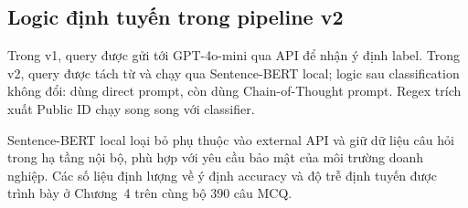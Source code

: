 \documentclass[../DoAn.tex]{subfiles}
\begin{document}
\subsection{Logic định tuyến trong pipeline v2}
\label{subsection:3.9.3}

Trong v1, query được gửi tới GPT-4o-mini qua API để nhận ý định label. Trong v2, query được tách từ và chạy qua Sentence-BERT local; logic sau classification không đổi:  dùng direct prompt, còn  dùng Chain-of-Thought prompt. Regex trích xuất Public ID chạy song song với classifier.

Sentence-BERT local loại bỏ phụ thuộc vào external API và giữ dữ liệu câu hỏi trong hạ tầng nội bộ, phù hợp với yêu cầu bảo mật của môi trường doanh nghiệp. Các số liệu định lượng về ý định accuracy và độ trễ định tuyến được trình bày ở Chương~4 trên cùng bộ 390 câu MCQ.
\end{document}
